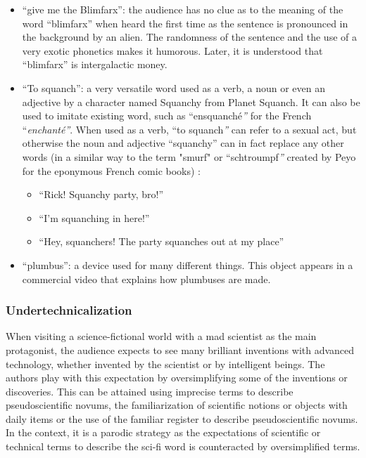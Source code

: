 \documentclass[output=paper]{langscibook}
\begin{document}
\begin{itemize}
\item “give me the Blimfarx”: the audience has no clue as to the meaning of the word “blimfarx” when heard the first time as the sentence is pronounced in the background by an alien. The randomness of the sentence and the use of a very exotic phonetics makes it humorous. Later, it is understood that “blimfarx” is intergalactic money.
\item “To squanch”: a very versatile word used as a verb, a noun or even an adjective by a character named Squanchy from Planet Squanch. It can also be used to imitate existing word, such as “ensquanché\textit{”} for the French “\textit{enchanté”}. When used as a verb, “to squanch\textit{”} can refer to a sexual act, but otherwise the noun and adjective “squanchy” can in fact replace any other words (in a similar way to the term "smurf" or “schtroumpf\textit{”} created by Peyo for the eponymous French comic books) :

\begin{itemize}
\item “Rick! Squanchy party, bro!”
\item “I’m squanching in here!”
\item “Hey, squanchers! The party squanches out at my place”
\end{itemize}
\item “plumbus”: a device used for many different things. This object appears in a commercial video that explains how plumbuses are made.
\end{itemize}

\subsubsection{Undertechnicalization}

When visiting a science-fictional world with a mad scientist as the main protagonist, the audience expects to see many brilliant inventions with advanced technology, whether invented by the scientist or by intelligent beings. The authors play with this expectation by oversimplifying some of the inventions or discoveries. This can be attained using imprecise terms to describe pseudoscientific novums, the familiarization of scientific notions or objects with daily items or the use of the familiar register to describe pseudoscientific novums. In the context, it is a parodic strategy as the expectations of scientific or technical terms to describe the sci-fi word is counteracted by oversimplified terms.
\end{document}
